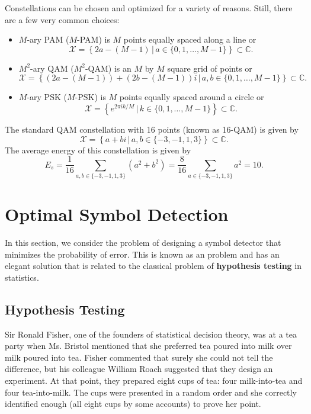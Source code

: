 Constellations can be chosen and optimized for a variety of reasons.
Still, there are a few very common choices:
\begin{itemize}
\item $M$-ary PAM ($M$-PAM) is $M$ points equally spaced along a line or
\[ \mathcal{X} = \left\{ 2a-(M-1) \, \big| \, a \in \{0,1,\ldots,M-1\} \right\} \subset \mathbb{C}. \]

\item $M^2$-ary QAM ($M^2$-QAM) is an $M$ by $M$ square grid of points or
\[ \mathcal{X} = \left\{ \left(2a-(M-1)\right)+ \left(2b-(M-1)\right)i \, \big| \, a,b \in \{0,1,\ldots,M-1\} \right\} \subset \mathbb{C}. \]

\item $M$-ary PSK ($M$-PSK) is $M$ points equally spaced around a circle or
\[ \mathcal{X} = \left\{ e^{2\pi i k/M} \, \big| \, k \in \{0,1,\ldots,M-1\} \right\} \subset \mathbb{C}. \]
\end{itemize}

\begin{example}
The standard QAM constellation with 16 points (known as 16-QAM) is given by
\[ \mathcal{X} = \left\{ a+bi \, \big| \, a,b \in \{-3,-1,1,3\} \right\} \subset \mathbb{C}. \]
The average energy of this constellation is given by
\[ E_s = \frac{1}{16} \sum_{a,b\in \{-3,-1,1,3\}} (a^2 + b^2) = \frac{8}{16}  \sum_{a\in \{-3,-1,1,3\}} a^2 = 10.\]
\end{example}

\section{Optimal Symbol Detection}

In this section, we consider the problem of designing a symbol detector that minimizes the probability of error.
This is known as an  problem and has an elegant solution that is related to the classical problem of \textbf{hypothesis testing} in statistics.

\subsection{Hypothesis Testing}

Sir Ronald Fisher, one of the founders of statistical decision theory, was at a tea party when Ms. Bristol mentioned that she preferred tea poured into milk over milk poured into tea.
Fisher commented that surely she could not tell the difference, but his colleague William Roach suggested that they design an experiment.
At that point, they prepared eight cups of tea: four milk-into-tea and four tea-into-milk.
The cups were presented in a random order and she correctly identified enough (all eight cups by some accounts) to prove her point.


